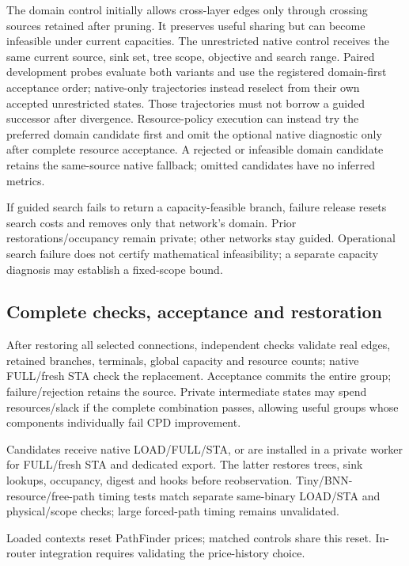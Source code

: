 \documentclass[conference,10pt]{IEEEtran}
\begin{document}
The domain control initially allows cross-layer edges only through crossing sources retained after pruning. It preserves useful sharing but can become infeasible under current capacities. The unrestricted native control receives the same current source, sink set, tree scope, objective and search range. Paired development probes evaluate both variants and use the registered domain-first acceptance order; native-only trajectories instead reselect from their own accepted unrestricted states. Those trajectories must not borrow a guided successor after divergence. Resource-policy execution can instead try the preferred domain candidate first and omit the optional native diagnostic only after complete resource acceptance. A rejected or infeasible domain candidate retains the same-source native fallback; omitted candidates have no inferred metrics.

If guided search fails to return a capacity-feasible branch, failure release resets search costs and removes only that network's domain. Prior restorations/occupancy remain private; other networks stay guided. Operational search failure does not certify mathematical infeasibility; a separate capacity diagnosis may establish a fixed-scope bound.

\subsection{Complete checks, acceptance and restoration}
After restoring all selected connections, independent checks validate real edges, retained branches, terminals, global capacity and resource counts; native FULL/fresh STA check the replacement. Acceptance commits the entire group; failure/rejection retains the source. Private intermediate states may spend resources/slack if the complete combination passes, allowing useful groups whose components individually fail CPD improvement.

Candidates receive native LOAD/FULL/STA, or are installed in a private worker for FULL/fresh STA and dedicated export. The latter restores trees, sink lookups, occupancy, digest and hooks before reobservation. Tiny/BNN-resource/free-path timing tests match separate same-binary LOAD/STA and physical/scope checks; large forced-path timing remains unvalidated.

Loaded contexts reset PathFinder prices; matched controls share this reset. In-router integration requires validating the price-history choice.
\end{document}
